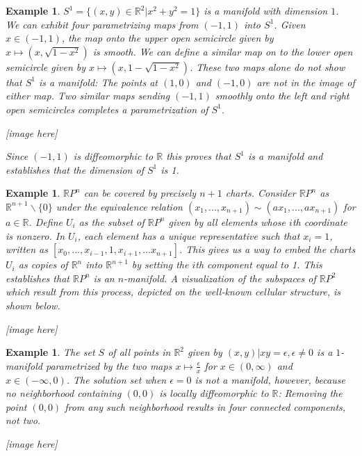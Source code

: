 \documentclass{amsart}          %
\newtheorem{example}[theorem]{Example}
\newcommand{\R}{\mathbb R}
\begin{document}
\begin{example}
	$S^1 = \{(x,y)\in \R^2 | x^2 + y^2=1\}$ is a manifold with dimension $1$. \\
	
	We can exhibit four parametrizing maps from $(-1,1)$ into $S^1$. Given $x \in (-1,1)$, the map onto the upper open semicircle given by $x\mapsto(x, \sqrt{1-x^2})$ is smooth. We can define a similar map on to the lower open semicircle given by $x \mapsto (x, 1-\sqrt{1-x^2})$. These two maps alone \textit{do not} show that $S^1$ is a manifold: The points at $(1,0)$ and $(-1,0)$ are not in the image of either map. Two similar maps sending $(-1,1)$ smoothly onto the left and right open semicircles completes a parametrization of $S^1$.  
	
	[image here]
	
	Since $(-1,1)$ is diffeomorphic to $\R$ this proves that $S^1$ is a manifold and establishes that the dimension of $S^1$ is 1. \\
\end{example} 

\begin{example}
	$\R P^n$ can be covered by precisely $n+1$ charts. Consider $\R P^n$ as $\R^{n+1} \backslash \{0\}$ under the equivalence relation $(x_1,..., x_{n+1})\sim (ax_1,...,ax_{n+1})$ for $a \in \R$. Define $U_i$ as the subset of $\R P^n$ given by all elements whose $i$th coordinate is nonzero. In $U_i$, each element has a unique representative such that $x_i=1$, written as $[x_0,...,x_{i-1},1,x_{i+1},...x_{n+1}]$. This gives us a way to embed the charts $U_i$ as copies of $\R^n$ into $\R^{n+1}$ by setting the $i$th component equal to 1. This establishes that $\R P^n$ is an $n$-manifold. A visualization of the subspaces of $\R P^2$  which result from this process, depicted on the well-known cellular structure, is shown below.
	
	[image here]  
	
\end{example}

\begin{example}
	The set $S$ of all points in $\R^2$ given by ${(x,y)|xy=\epsilon, \epsilon\neq 0}$ is a $1$-manifold parametrized by the two maps $x \mapsto \frac{\epsilon}{x}$ for $x\in (0,\infty)$ and $x \in (-\infty,0)$. The solution set when $\epsilon = 0$ is not a manifold, however, because no neighborhood containing $(0,0)$ is locally diffeomorphic to $\R$: Removing the point $(0,0)$ from any such neighborhood results in four connected components, not two.  
	
	[image here]
\end{example}
\end{document}
